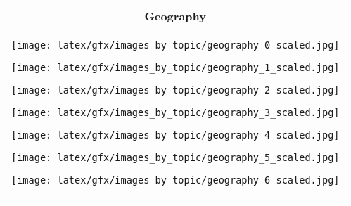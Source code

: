 \begin{table*}[ht]
\begin{tabular}{c}
            \textbf{Geography}  \\ \cmidrule(lr){1-1}
                    \begin{minipage}{0.08\textwidth}
                        \centering
                        \texttt{[image: latex/gfx/images\_by\_topic/geography\_0\_scaled.jpg]}
                    \end{minipage}
                    \hfill
                    \begin{minipage}{0.08\textwidth}
                        \centering
                        \texttt{[image: latex/gfx/images\_by\_topic/geography\_1\_scaled.jpg]}
                    \end{minipage}
                    \hfill
                    \begin{minipage}{0.08\textwidth}
                        \centering
                        \texttt{[image: latex/gfx/images\_by\_topic/geography\_2\_scaled.jpg]}
                    \end{minipage}
                    \hfill
                    \begin{minipage}{0.08\textwidth}
                        \centering
                        \texttt{[image: latex/gfx/images\_by\_topic/geography\_3\_scaled.jpg]}
                    \end{minipage}
                    \hfill
                    \begin{minipage}{0.08\textwidth}
                        \centering
                        \texttt{[image: latex/gfx/images\_by\_topic/geography\_4\_scaled.jpg]}
                    \end{minipage}
                    \hfill
                    \begin{minipage}{0.08\textwidth}
                        \centering
                        \texttt{[image: latex/gfx/images\_by\_topic/geography\_5\_scaled.jpg]}
                    \end{minipage}
                    \hfill
                    \begin{minipage}{0.08\textwidth}
                        \centering
                        \texttt{[image: latex/gfx/images\_by\_topic/geography\_6\_scaled.jpg]}
                    \end{minipage}
                    \hfill
                    \begin{minipage}{0.08\textwidth}

\end{minipage}
\end{tabular}
\end{table*}
